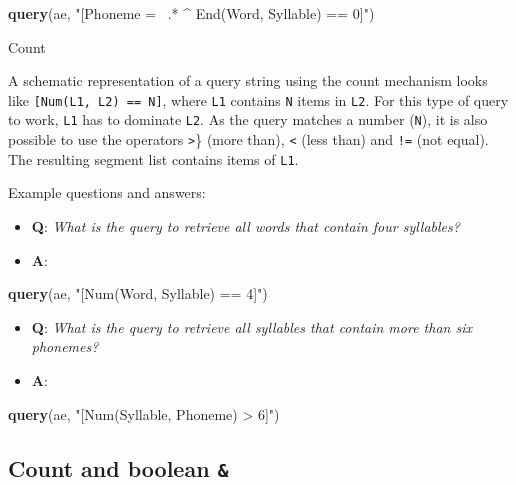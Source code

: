 \documentclass[]{book}
\newenvironment{Shaded}{\begin{snugshade}}{\end{snugshade}}
\newcommand{\KeywordTok}[1]{\textcolor[rgb]{0.13,0.29,0.53}{\textbf{#1}}}
\newcommand{\NormalTok}[1]{#1}
\newcommand{\StringTok}[1]{\textcolor[rgb]{0.31,0.60,0.02}{#1}}
\providecommand{\tightlist}{%
  \setlength{\itemsep}{0pt}\setlength{\parskip}{0pt}}
\theoremstyle{definition}
\theoremstyle{definition}
\theoremstyle{definition}
\theoremstyle{remark}
\begin{document}
\begin{Shaded}
\begin{Highlighting}[]
\KeywordTok{query}\NormalTok{(ae, }\StringTok{"[Phoneme =~ .* ^ End(Word, Syllable) == 0]"}\NormalTok{)}
\end{Highlighting}
\end{Shaded}

Count

A schematic representation of a query string using the count mechanism
looks like \texttt{{[}Num(L1,\ L2)\ ==\ N{]}}, where \texttt{L1}
contains \texttt{N} items in \texttt{L2}. For this type of query to
work, \texttt{L1} has to dominate \texttt{L2}. As the query matches a
number (\texttt{N}), it is also possible to use the operators
\texttt{\textgreater{}}\} (more than), \texttt{\textless{}} (less than)
and \texttt{!=} (not equal). The resulting segment list contains items
of \texttt{L1}.

Example questions and answers:

\begin{itemize}
\tightlist
\item
  \textbf{Q}: \emph{What is the query to retrieve all words that contain
  four syllables?}
\item
  \textbf{A}:
\end{itemize}

\begin{Shaded}
\begin{Highlighting}[]
\KeywordTok{query}\NormalTok{(ae, }\StringTok{"[Num(Word, Syllable) == 4]"}\NormalTok{)}
\end{Highlighting}
\end{Shaded}

\begin{itemize}
\tightlist
\item
  \textbf{Q}: \emph{What is the query to retrieve all syllables that
  contain more than six phonemes?}
\item
  \textbf{A}:
\end{itemize}

\begin{Shaded}
\begin{Highlighting}[]
\KeywordTok{query}\NormalTok{(ae, }\StringTok{"[Num(Syllable, Phoneme) > 6]"}\NormalTok{)}
\end{Highlighting}
\end{Shaded}

\hypertarget{count-and-boolean}{%
\subsection{\texorpdfstring{Count and boolean
\texttt{\&}}{Count and boolean \&}}\label{count-and-boolean}}
\end{document}
